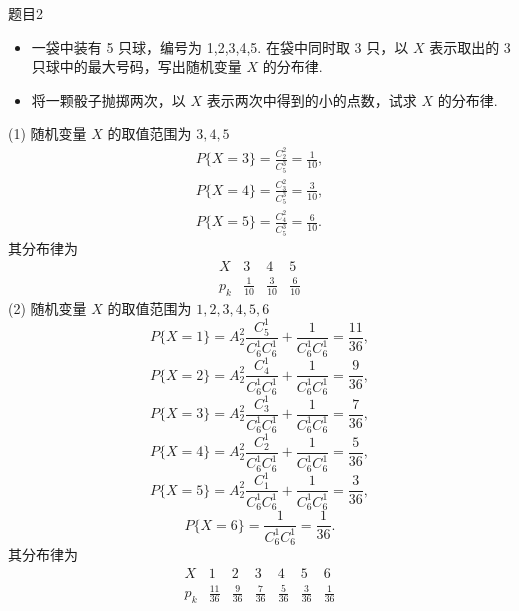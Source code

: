 \begin{question}{题目2}
    \begin{itemize}
        \item [(1)] 一袋中装有 5 只球，编号为 1,2,3,4,5. 在袋中同时取 3 只，以 $X$ 表示取出的 3 只球中的最大号码，写出随机变量 $X$ 的分布律.
        \item [(2)] 将一颗骰子抛掷两次，以 $X$ 表示两次中得到的小的点数，试求 $X$ 的分布律.
    \end{itemize}
\end{question}
\begin{solution}
    (1) 随机变量 $X$ 的取值范围为 $3, 4, 5$
    $$
        \begin{aligned}
            P\{X = 3\} = \frac{C_2^2}{C_5^3} = \frac{1}{10}, \\
            P\{X = 4\} = \frac{C_3^2}{C_5^3} = \frac{3}{10}, \\
            P\{X = 5\} = \frac{C_4^2}{C_5^3} = \frac{6}{10}.
        \end{aligned}
    $$
    其分布律为
    $$
        \begin{array}{c|ccc}
            X   & 3            & 4            & 5            \\
            \hline
            p_k & \frac{1}{10} & \frac{3}{10} & \frac{6}{10}
        \end{array}
    $$
    (2) 随机变量 $X$ 的取值范围为 $1, 2, 3, 4, 5, 6$
    $$
        P\{X=1\} = A_2^2\frac{C_5^1}{C_6^1C_6^1} + \frac{1}{C_6^1C_6^1} = \frac{11}{36},
    $$
    $$
        P\{X=2\} = A_2^2\frac{C_4^1}{C_6^1C_6^1} + \frac{1}{C_6^1C_6^1} = \frac{9}{36},
    $$
    $$
        P\{X=3\} = A_2^2\frac{C_3^1}{C_6^1C_6^1} + \frac{1}{C_6^1C_6^1} = \frac{7}{36},
    $$
    $$
        P\{X=4\} = A_2^2\frac{C_2^1}{C_6^1C_6^1} + \frac{1}{C_6^1C_6^1} = \frac{5}{36},
    $$
    $$
        P\{X=5\} = A_2^2\frac{C_1^1}{C_6^1C_6^1} + \frac{1}{C_6^1C_6^1} = \frac{3}{36},
    $$
    $$
        P\{X=6\} = \frac{1}{C_6^1C_6^1} = \frac{1}{36}.
    $$
    其分布律为
    $$
        \begin{array}{c|cccccc}
            X   & 1             & 2            & 3            & 4            & 5            & 6            \\
            \hline
            p_k & \frac{11}{36} & \frac{9}{36} & \frac{7}{36} & \frac{5}{36} & \frac{3}{36} & \frac{1}{36} \\
        \end{array}
    $$
\end{solution}

